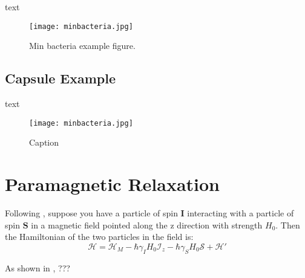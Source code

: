 \documentclass{article}
\begin{document}
text
\begin{figure}[h]
    \centering
    \texttt{[image: minbacteria.jpg]}
    \caption{Min bacteria example figure.}
    \label{fig:min-bacteria}
\end{figure}

\subsection{Capsule Example}

text
\begin{figure}[h]
    \centering
    \texttt{[image: minbacteria.jpg]}
    \caption{Caption}
    \label{fig:capsule}
\end{figure}

\section{Paramagnetic Relaxation}


Following \cite{solomon_relaxation_1955}, suppose you have a particle of spin $\mathbf{I}$ interacting with a particle of spin $\mathbf{S}$ in a magnetic field pointed along the z direction with strength $H_0$. Then the Hamiltonian of the two particles in the field is:
\begin{equation}
    \mathcal{H} = \mathcal{H}_{M} -\hbar \gamma_I H_0 \mathcal{I}_z -\hbar \gamma_S H_0 \mathcal{S} + \mathcal{H}'
\end{equation}

As shown in \cite{solomon...}, ???


\end{document}
